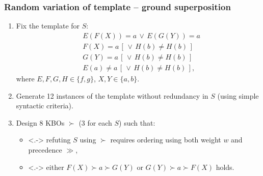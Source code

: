 \documentclass[xcolor={table}]{beamer}
\begin{document}


\begin{frame}
  \frametitle{Random variation of template -- ground superposition}

  \begin{enumerate}[<+->]
\item Fix the template for $S$:
{\small
\begin{align*}
  &E(F(X)) = a \,\lor\, E(G(Y)) = a \\
  &F(X) = a \,[\, \lor\, H(b) \not= H(b) \,] \\
  &G(Y) = a \,[\, \lor\, H(b) \not= H(b) \,] \\
  &E(a) \not= a \,[\, \lor\, H(b) \not= H(b) \,],
\end{align*}
}
where $E, F, G, H \in \{f, g\}$, $X, Y \in \{a, b\}$.
\item Generate 12 instances of the template without redundancy in $S$
  (using simple syntactic criteria).
\item Design 8 KBOs $\succ$ (3 for each $S$) such that:
  \begin{itemize}
    \item<.-> refuting $S$ using $\succ$ requires ordering using both weight $w$ and precedence $\gg$,
    \item<.-> either $F(X) \succ a \succ G(Y)$ or $G(Y) \succ a \succ F(X)$ holds.
  \end{itemize}
\end{enumerate}

\end{frame}
\end{document}
